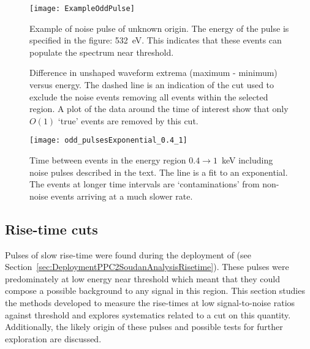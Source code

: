 	
			\begin{figure}
				\centering
				\texttt{[image: ExampleOddPulse]}
				\caption[Example of noise pulse of unknown origin]
				{Example of noise pulse of unknown origin.  The energy of the pulse is specified in the figure: 532~eV. 
				This indicates that these events can populate the spectrum near threshold.}
				\label{fig:OddPulseExample}
			\end{figure}	

			\begin{figure}
				\centering
				\def\plotwidth{0.76\textwidth}
				\caption[Difference in unshaped waveform extrema versus energy]
				{Difference in unshaped waveform extrema (maximum - minimum) versus energy.  The dashed line is an indication of the cut used to exclude the 
				noise events removing all events within the selected region.  A plot of the data around the time of interest
				show that only $O(1)$ `true' events are removed by this cut.  }
				\label{fig:OddPulseCut}
			\end{figure}

			\begin{figure}
				\centering
				\texttt{[image: odd\_pulsesExponential\_0.4\_1]}
				\caption[Time between noise pulses]
				{Time between events in the energy region $0.4\to1$~keV including noise pulses described in the text. 
				 The line is a fit to an exponential.  The events at longer time intervals are `contaminations' from non-noise
				 events arriving at a much slower rate.}
				\label{fig:OddPulseRate}
			\end{figure}
				
		\subsection{Rise-time cuts}
	     	\label{sec:RisetimeCuts}	

	Pulses of slow rise-time were found during the deployment of  (see Section~\ref{sec:DeploymentPPC2SoudanAnalysisRisetime}).  These pulses were predominately at low energy near threshold which meant that they could compose a possible background to any signal in this region.  This section studies the methods developed to measure the rise-times at low signal-to-noise ratios against threshold and explores systematics related to a cut on this quantity.  Additionally, the likely origin of these pulses and possible tests for further exploration are discussed. 
	

